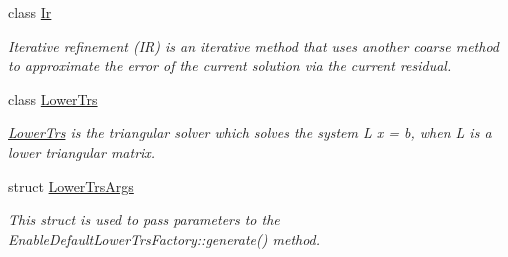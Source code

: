 \begin{DoxyCompactItemize}
class \hyperlink{classgko_1_1solver_1_1Ir}{Ir}
\begin{DoxyCompactList}\small\item\em Iterative refinement (IR) is an iterative method that uses another coarse method to approximate the error of the current solution via the current residual. \end{DoxyCompactList}\item 
class \hyperlink{classgko_1_1solver_1_1LowerTrs}{Lower\+Trs}
\begin{DoxyCompactList}\small\item\em \hyperlink{classgko_1_1solver_1_1LowerTrs}{Lower\+Trs} is the triangular solver which solves the system L x = b, when L is a lower triangular matrix. \end{DoxyCompactList}\item 
struct \hyperlink{structgko_1_1solver_1_1LowerTrsArgs}{Lower\+Trs\+Args}
\begin{DoxyCompactList}\small\item\em This struct is used to pass parameters to the Enable\+Default\+Lower\+Trs\+Factory\+::generate() method. \end{DoxyCompactList}\end{DoxyCompactItemize}
